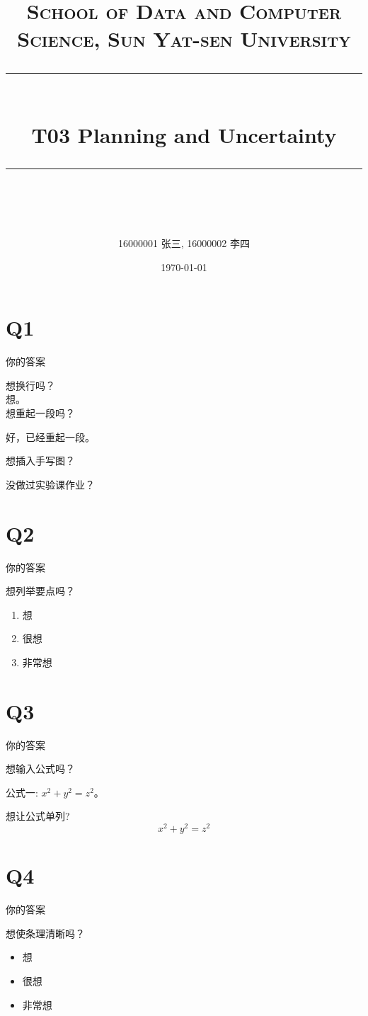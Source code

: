 \documentclass[a4paper, 11pt]{article}
\title{	
\normalfont \normalsize
\textsc{School of Data and Computer Science, Sun Yat-sen University} \\ [25pt] %
\rule{\textwidth}{0.5pt} \\[0.4cm] %
\huge  T03 Planning and Uncertainty\\ %
\rule{\textwidth}{2pt} \\[0.5cm] %
\author{16000001 张三, 16000002 李四}
\date{\normalsize\today}
}
\begin{document}
\maketitle
\tableofcontents
\newpage
\section{Q1}
你的答案

想换行吗？\\
想。\\
想重起一段吗？

好，已经重起一段。

想插入手写图？

没做过实验课作业？
\section{Q2}
你的答案


想列举要点吗？

\begin{enumerate}
\item 想
\item 很想
\item 非常想
\end{enumerate}
\section{Q3}
你的答案

想输入公式吗？

公式一: $x^2+y^2=z^2$。

想让公式单列?
$$x^2+y^2=z^2$$
\section{Q4}
你的答案

想使条理清晰吗？

\begin{itemize}
\item 想
\item 很想
\item 非常想
\end{itemize}

%
%
\end{document}
